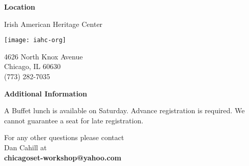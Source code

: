 \documentclass[12pt,
notumble,
letterpaper]{leaflet}
\begin{document}
\pagebreak

\begin{flushleft}
{\Large \textbf{Location}}

\vspace*{1.5em}
{\large {Irish American Heritage Center}}
\end{flushleft}

\vspace*{0.45em}
\begin{center}
\texttt{[image: iahc-org]}
\end{center}

4626 North Knox Avenue\\
Chicago, IL 60630\\
(773) 282-7035

\begin{flushleft}
{\large \textbf{Additional Information}}

\vspace*{1em}
A Buffet lunch is available on Saturday.  Advance registration is required.  We cannot guarantee a seat for late registration.

For any other questions please contact  \\Dan Cahill at\\ \textbf{chicagoset-workshop@yahoo.com}
\end{flushleft}
\end{document}
